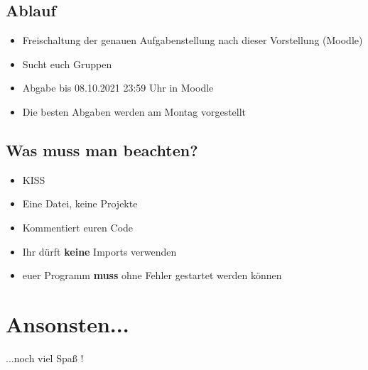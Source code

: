 \subsection{Ablauf}
\begin{frame}
	\slidehead
	\begin{itemize}
		\item Freischaltung der genauen Aufgabenstellung nach dieser Vorstellung (Moodle)
		\item Sucht euch Gruppen
		\item Abgabe bis 08.10.2021 23:59 Uhr in Moodle
		\item Die besten Abgaben werden am Montag vorgestellt
	\end{itemize}
\end{frame}

\subsection{Was muss man beachten?}
\begin{frame}
	\slidehead
	\begin{itemize}
		\item KISS
		\item Eine Datei, keine Projekte
		\item Kommentiert euren Code
		\item Ihr dürft \textbf{keine} Imports verwenden
		\item euer Programm \textbf{muss} ohne Fehler gestartet werden können
	\end{itemize}
\end{frame}

\section{Ansonsten...}
\begin{frame}
	\slidehead
	\vspace{\fill}
	\begin{center}
		\huge ...noch viel Spaß !
	\end{center}
	\vspace{\fill}
\end{frame}
